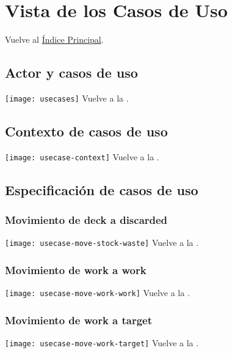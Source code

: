 \newpage{}
\section{Vista de los Casos de Uso}\label{usecasetoc}

\secttoc
Vuelve al \hyperlink{toc}{Índice Principal}.

\newpage{}
\subsection{Actor y casos de uso}
\texttt{[image: usecases]}
Vuelve a la .

\newpage{}
\subsection{Contexto de casos de uso}
\texttt{[image: usecase-context]}
Vuelve a la .

\newpage{}
\subsection{Especificación de casos de uso}

\subsubsection{Movimiento de deck a discarded}
\texttt{[image: usecase-move-stock-waste]}
Vuelve a la .

\newpage{}
\subsubsection{Movimiento de work a work}
\texttt{[image: usecase-move-work-work]}
Vuelve a la .

\newpage{}
\subsubsection{Movimiento de work a target}
\texttt{[image: usecase-move-work-target]}
Vuelve a la .

